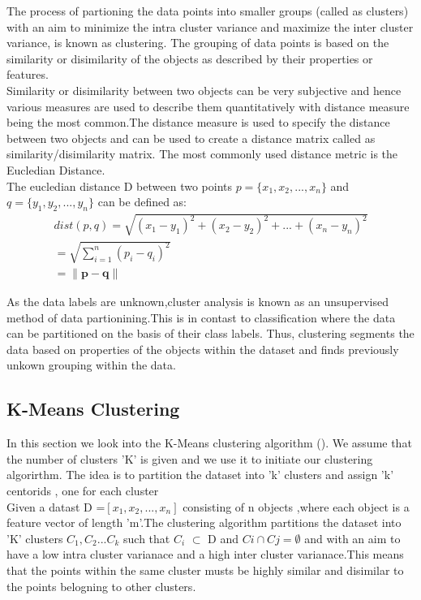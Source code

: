 The process of partioning the data points into smaller groups (called as clusters) with an aim to minimize the intra cluster variance and maximize the inter cluster variance, is known as clustering. The grouping of data points is based on the similarity or disimilarity of the objects as described by their properties or features.\\

Similarity or disimilarity between two objects can be very subjective and hence various measures are used to describe them quantitatively with distance measure being the most common.The distance measure is used to specify the distance between two objects and can be used to create a distance matrix called as similarity/disimilarity matrix. The most commonly used distance metric is the Eucledian Distance.\\

The eucledian distance D between two points $p =\{x_1, x_2, ... , x_n\}$ and $q =\{y_1, y_2, ... , y_n\}$ can be defined as:
\begin{equation}\label{eq: eucledian dist}
\begin{split}
dist(p,q) =  \sqrt{(x_1 - y_1)^2 + (x_2 - y_2)^2 + ... +(x_n - y_n)^2 } \\
		 =  \sqrt{\sum_{i=1}^{n}(p_i - q_i)^2} \\
		 = \lVert \mathbf{p-q} \rVert
\end{split}
\end{equation}

As the data labels are unknown,cluster analysis is known as an unsupervised method of data partionining.This is in contast to classification where the data can be partitioned on the basis of their class labels. Thus, clustering segments the data based on properties of the objects within the dataset and finds previously unkown grouping within the data.

\subsection{K-Means Clustering}
In this section we look into the K-Means clustering algorithm (\citet{macqueen1967some}). We assume that the number of clusters 'K' is given and we use it to initiate our clustering algorirthm. The idea is to partition the dataset into 'k' clusters and assign 'k' centorids , one for each cluster \\

Given a datast D =$[x_1,x_2,...,x_n]$ consisting of n objects ,where each object is a feature vector of length 'm'.The clustering algorithm partitions the dataset into 'K' clusters $C_1,C_2...C_k$ such that $C_i$ $\subset$ D and $Ci \cap Cj = \emptyset$ and with an aim to have a low intra cluster varianace and a high inter cluster varianace.This means that the points within the same cluster musts be highly similar and disimilar to the points belogning to other clusters.\\

